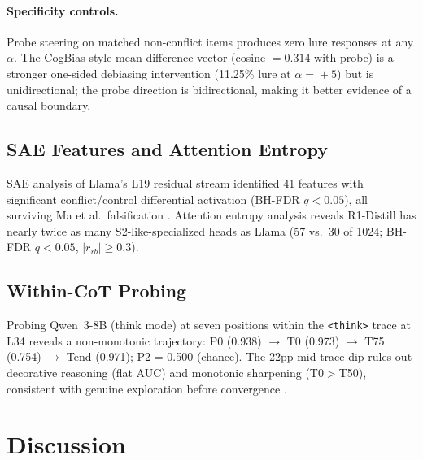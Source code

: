 \documentclass[twocolumn,10pt]{article}
\newcommand{\stwo}{S2-like}
\begin{document}
\paragraph{Specificity controls.}
Probe steering on matched non-conflict items produces zero lure
responses at any $\alpha$.  The CogBias-style mean-difference vector
(cosine $= 0.314$ with probe) is a stronger one-sided debiasing
intervention (11.25\% lure at $\alpha\!=\!+5$) but is unidirectional;
the probe direction is bidirectional, making it better evidence of a
causal boundary.

\subsection{SAE Features and Attention Entropy}
\label{sec:results_sae}

SAE analysis of Llama's L19 residual stream identified 41 features
with significant conflict/control differential activation (BH-FDR
$q < 0.05$), all surviving Ma et al.\ falsification
\citep{ma2026falsification}.  Attention entropy analysis reveals
R1-Distill has nearly twice as many \stwo{}-specialized heads as Llama
(57 vs.\ 30 of 1024; BH-FDR $q < 0.05$, $|r_{rb}| \geq 0.3$).

\subsection{Within-CoT Probing}
\label{sec:within_cot}

Probing Qwen~3-8B (think mode) at seven positions within the
\texttt{<think>} trace at L34 reveals a non-monotonic trajectory:
P0 (0.938) $\to$ T0 (0.973) $\to$ T75 (0.754) $\to$ Tend (0.971);
P2 = 0.500 (chance).  The 22pp mid-trace dip rules out decorative
reasoning (flat AUC) and monotonic sharpening (T0$>$T50), consistent
with genuine exploration before convergence
\citep{boppana2026reasoning}.


\section{Discussion}
\label{sec:discussion}
\end{document}
